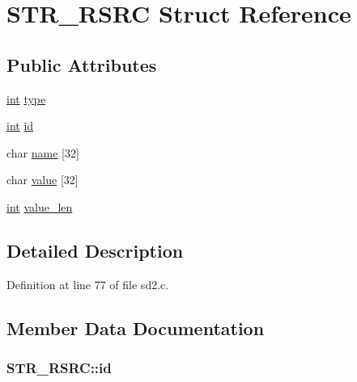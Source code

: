 \hypertarget{struct_s_t_r___r_s_r_c}{}\section{S\+T\+R\+\_\+\+R\+S\+RC Struct Reference}
\label{struct_s_t_r___r_s_r_c}
\subsection*{Public Attributes}
\begin{DoxyCompactItemize}
\item 
\hyperlink{xmltok_8h_a5a0d4a5641ce434f1d23533f2b2e6653}{int} \hyperlink{struct_s_t_r___r_s_r_c_aaf9ee927a9106a52ba7c9272f073db76}{type}
\item 
\hyperlink{xmltok_8h_a5a0d4a5641ce434f1d23533f2b2e6653}{int} \hyperlink{struct_s_t_r___r_s_r_c_a104b58a54716e1b69d9977b539fb0f65}{id}
\item 
char \hyperlink{struct_s_t_r___r_s_r_c_a067c2ecf1b8cf086dc212ae745ba0cad}{name} \mbox{[}32\mbox{]}
\item 
char \hyperlink{struct_s_t_r___r_s_r_c_a42b8f09b20f5749a94aadba8ab8fe16f}{value} \mbox{[}32\mbox{]}
\item 
\hyperlink{xmltok_8h_a5a0d4a5641ce434f1d23533f2b2e6653}{int} \hyperlink{struct_s_t_r___r_s_r_c_a37af69ee0e36153c34351ce5f45e218a}{value\+\_\+len}
\end{DoxyCompactItemize}


\subsection{Detailed Description}


Definition at line 77 of file sd2.\+c.



\subsection{Member Data Documentation}
\subsubsection[{\texorpdfstring{id}{id}}]{ S\+T\+R\+\_\+\+R\+S\+R\+C\+::id}\hypertarget{struct_s_t_r___r_s_r_c_a104b58a54716e1b69d9977b539fb0f65}{}\label{struct_s_t_r___r_s_r_c_a104b58a54716e1b69d9977b539fb0f65}


